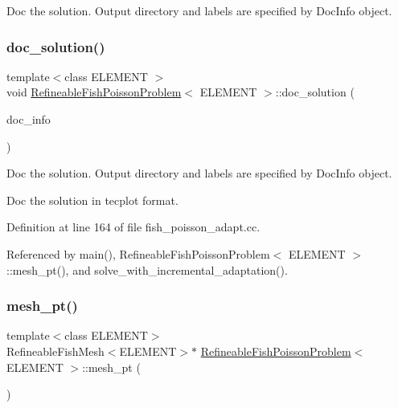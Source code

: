 Doc the solution. Output directory and labels are specified by Doc\+Info object. 

\mbox{\label{classRefineableFishPoissonProblem_aeee1bf23216971b50b8822c45e62c48b}} 
\subsubsection{\texorpdfstring{doc\+\_\+solution()}{doc\_solution()}\hspace{0.1cm}{\footnotesize\ttfamily [2/2]}}
{\footnotesize\ttfamily template$<$class E\+L\+E\+M\+E\+NT $>$ \\
void \hyperlink{classRefineableFishPoissonProblem}{Refineable\+Fish\+Poisson\+Problem}$<$ E\+L\+E\+M\+E\+NT $>$\+::doc\+\_\+solution (\begin{DoxyParamCaption}\item[{Doc\+Info \&}]{doc\+\_\+info }\end{DoxyParamCaption})}



Doc the solution. Output directory and labels are specified by Doc\+Info object. 

Doc the solution in tecplot format. 

Definition at line 164 of file fish\+\_\+poisson\+\_\+adapt.\+cc.



Referenced by main(), Refineable\+Fish\+Poisson\+Problem$<$ E\+L\+E\+M\+E\+N\+T $>$\+::mesh\+\_\+pt(), and solve\+\_\+with\+\_\+incremental\+\_\+adaptation().

\mbox{\label{classRefineableFishPoissonProblem_a803c9050b07b35aba22f08a5a9e59f2c}} 
\subsubsection{\texorpdfstring{mesh\+\_\+pt()}{mesh\_pt()}\hspace{0.1cm}{\footnotesize\ttfamily [1/2]}}
{\footnotesize\ttfamily template$<$class E\+L\+E\+M\+E\+NT$>$ \\
Refineable\+Fish\+Mesh$<$E\+L\+E\+M\+E\+NT$>$$\ast$ \hyperlink{classRefineableFishPoissonProblem}{Refineable\+Fish\+Poisson\+Problem}$<$ E\+L\+E\+M\+E\+NT $>$\+::mesh\+\_\+pt (\begin{DoxyParamCaption}{ }\end{DoxyParamCaption})\hspace{0.3cm}{\ttfamily [inline]}}



